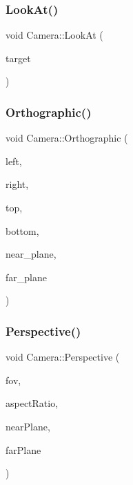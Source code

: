 \mbox{\label{class_camera_a657181de0da2b330865d005a3e08cc9f}} 
\subsubsection{\texorpdfstring{LookAt()}{LookAt()}}
{\footnotesize\ttfamily void Camera\+::\+Look\+At (\begin{DoxyParamCaption}\item[{glm\+::vec3}]{target }\end{DoxyParamCaption})}

\mbox{\label{class_camera_ad434a557e137d9c24369a3737f857736}} 
\subsubsection{\texorpdfstring{Orthographic()}{Orthographic()}}
{\footnotesize\ttfamily void Camera\+::\+Orthographic (\begin{DoxyParamCaption}\item[{G\+Lfloat}]{left,  }\item[{G\+Lfloat}]{right,  }\item[{G\+Lfloat}]{top,  }\item[{G\+Lfloat}]{bottom,  }\item[{G\+Lfloat}]{near\+\_\+plane,  }\item[{G\+Lfloat}]{far\+\_\+plane }\end{DoxyParamCaption})}

\mbox{\label{class_camera_a61d3c3da4bab7c69c7f24c3f37abe1e5}} 
\subsubsection{\texorpdfstring{Perspective()}{Perspective()}}
{\footnotesize\ttfamily void Camera\+::\+Perspective (\begin{DoxyParamCaption}\item[{G\+Lfloat}]{fov,  }\item[{G\+Lfloat}]{aspect\+Ratio,  }\item[{G\+Lfloat}]{near\+Plane,  }\item[{G\+Lfloat}]{far\+Plane }\end{DoxyParamCaption})}

